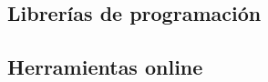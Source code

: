 \documentclass{../../miPlantilla}
\begin{document}

\subsection{Librerías de programación}


\subsection{Herramientas online}

\end{document}
